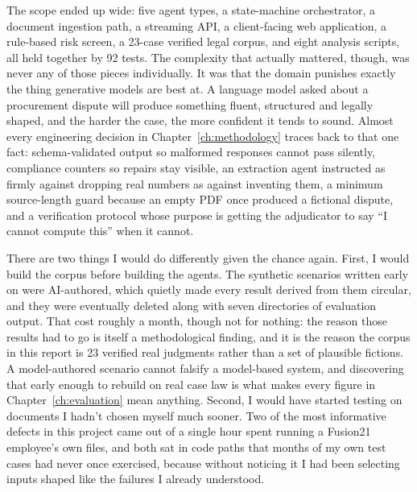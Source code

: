 The scope ended up wide: five agent types, a state-machine orchestrator, a
document ingestion path, a streaming API, a client-facing web application, a
rule-based risk screen, a 23-case verified legal corpus, and eight analysis
scripts, all held together by 92 tests. The complexity that actually mattered,
though, was never any of those pieces individually. It was that the domain
punishes exactly the thing generative models are best at. A language model asked
about a procurement dispute will produce something fluent, structured and
legally shaped, and the harder the case, the more confident it tends to sound.
Almost every engineering decision in Chapter~\ref{ch:methodology} traces back to
that one fact: schema-validated output so malformed responses cannot pass
silently, compliance counters so repairs stay visible, an extraction agent
instructed as firmly against dropping real numbers as against inventing them, a
minimum source-length guard because an empty PDF once produced a fictional
dispute, and a verification protocol whose purpose is getting the adjudicator to
say ``I cannot compute this'' when it cannot.

There are two things I would do differently given the chance again. First, I
would build the corpus before building the agents. The synthetic scenarios
written early on were AI-authored, which quietly made every result derived from
them circular, and they were eventually deleted along with seven directories of
evaluation output. That cost roughly a month, though not for nothing: the reason
those results had to go is itself a methodological finding, and it is the reason
the corpus in this report is 23 verified real judgments rather than a set of
plausible fictions. A model-authored scenario cannot falsify a model-based
system, and discovering that early enough to rebuild on real case law is what
makes every figure in Chapter~\ref{ch:evaluation} mean anything.
Second, I would have started testing on documents I hadn't chosen myself much
sooner. Two of the most informative defects in this project came out of a
single hour spent running a Fusion21 employee's own files, and both sat in code
paths that months of my own test cases had never once exercised, because
without noticing it I had been selecting inputs shaped like the failures
I already understood.

